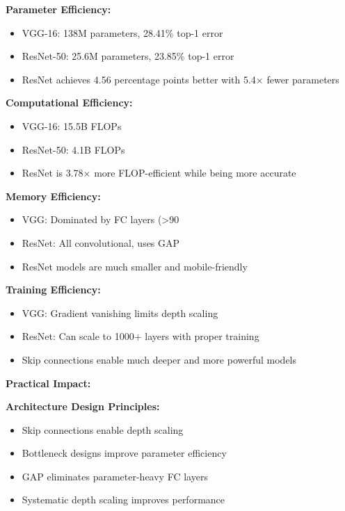 \documentclass[12pt]{article}
\begin{document}
\begin{enumerate}[(a)]
{    \textbf{Parameter Efficiency:}
    \begin{itemize}
        \item VGG-16: 138M parameters, 28.41\% top-1 error
        \item ResNet-50: 25.6M parameters, 23.85\% top-1 error
        \item ResNet achieves 4.56 percentage points better with 5.4× fewer parameters
    \end{itemize}
    
    \textbf{Computational Efficiency:}
    \begin{itemize}
        \item VGG-16: 15.5B FLOPs
        \item ResNet-50: 4.1B FLOPs  
        \item ResNet is 3.78× more FLOP-efficient while being more accurate
    \end{itemize}
    
    \textbf{Memory Efficiency:}
    \begin{itemize}
        \item VGG: Dominated by FC layers (>90%
        \item ResNet: All convolutional, uses GAP
        \item ResNet models are much smaller and mobile-friendly
    \end{itemize}
    
    \textbf{Training Efficiency:}
    \begin{itemize}
        \item VGG: Gradient vanishing limits depth scaling
        \item ResNet: Can scale to 1000+ layers with proper training
        \item Skip connections enable much deeper and more powerful models
    \end{itemize}
    
    \textbf{Practical Impact:}
    
    \textbf{Architecture Design Principles:}
    \begin{itemize}
        \item Skip connections enable depth scaling
        \item Bottleneck designs improve parameter efficiency
        \item GAP eliminates parameter-heavy FC layers
        \item Systematic depth scaling improves performance
    \end{itemize}
    
}
\end{enumerate}
\end{document}
